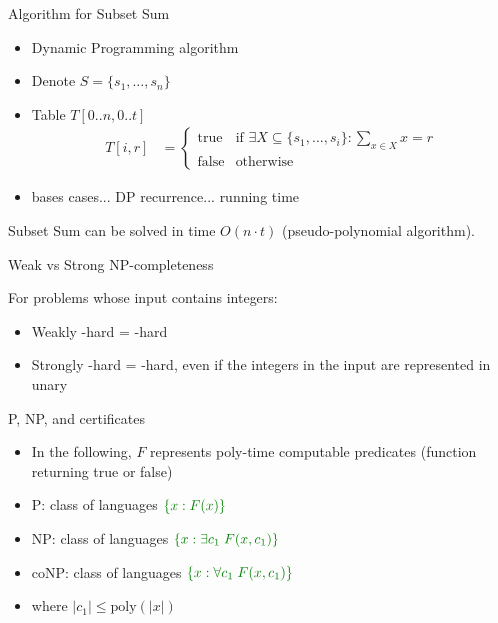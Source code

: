 

\begin{frame}{Algorithm for Subset Sum}


	\pause
	\begin{itemize}
		\item Dynamic Programming algorithm
		\item Denote $S=\{s_1,\dots,s_n\}$
		\item Table $T[0..n,0..t]$
		      \pause
		      \begin{align*}
			      T[i,r] & =
			      \begin{cases}
				      \text{true}  & \text{if } \exists X\subseteq \{s_1,\dots,s_i\} : \sum_{x\in X} x = r \\
				      \text{false} & \text{otherwise}
			      \end{cases}
		      \end{align*}
		      \pause
		\item bases cases... DP recurrence... running time
	\end{itemize}
	\pause
	Subset Sum can be solved in time $O(n\cdot t)$
	\pause
	(pseudo-polynomial algorithm).
\end{frame}


\begin{frame}{Weak vs Strong NP-completeness}

	For problems whose input contains integers:
	\begin{itemize}
		\item Weakly \NP-hard = \NP-hard
		\item Strongly \NP-hard = \NP-hard, even if the integers in the input are represented in unary
	\end{itemize}
\end{frame}


\begin{frame}{P, NP, and certificates}

	\begin{itemize}
		\item In the following, $F$ represents poly-time computable predicates (function returning true or false)
		\item P: class of languages $\color{Green}{\{x : F(x)\}}$
		\item NP: class of languages $\color{Green}{\{x : \exists c_1\; F(x,c_1)\}}$
		\item coNP: class of languages $\color{Green}{\{x : \forall c_1\; F(x,c_1)\}}$
		\item where $|c_1| \le \text{poly}(|x|)$
	\end{itemize}

\end{frame}

